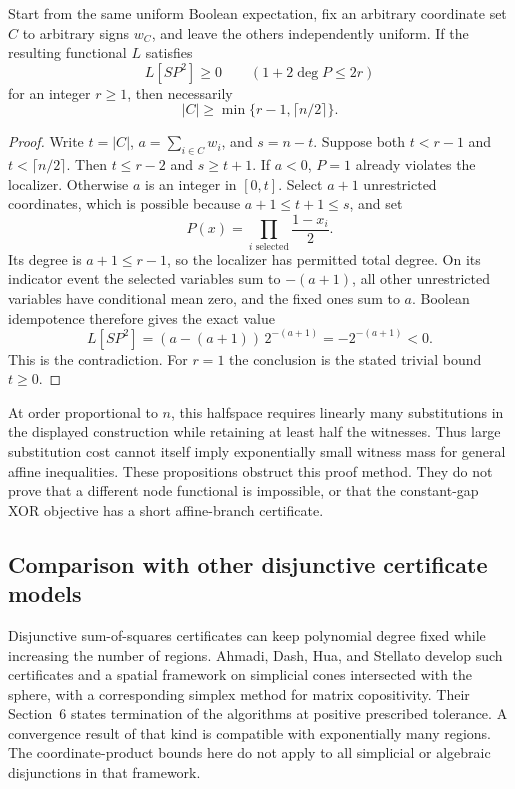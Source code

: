\begin{proposition}
\label{prop:affine-substitution-obstruction}
Start from the same uniform Boolean expectation, fix an arbitrary
coordinate set $C$ to arbitrary signs $w_C$, and leave the others
independently uniform. If the resulting functional $L$ satisfies
\[
 L[SP^2]\ge0\qquad(1+2\deg P\le2r)
\]
for an integer $r\ge1$, then necessarily
\begin{equation}\label{eq:affine-substitution-count}
 |C|\ge\min\{r-1,\lceil n/2\rceil\}.
\end{equation}
\end{proposition}
\begin{proof}
Write $t=|C|$, $a=\sum_{i\in C}w_i$, and $s=n-t$. Suppose both
$t<r-1$ and $t<\lceil n/2\rceil$. Then $t\le r-2$ and $s\ge t+1$.
If $a<0$, $P=1$ already violates the localizer. Otherwise $a$ is an
integer in $[0,t]$. Select $a+1$ unrestricted coordinates, which is
possible because $a+1\le t+1\le s$, and set
\[
 P(x)=\prod_{i\text{ selected}}\frac{1-x_i}{2}.
\]
Its degree is $a+1\le r-1$, so the localizer has permitted total degree.
On its indicator event the selected variables sum to $-(a+1)$, all
other unrestricted variables have conditional mean zero, and the fixed
ones sum to $a$. Boolean idempotence therefore gives the exact value
\[
 L[SP^2]=(a-(a+1))\,2^{-(a+1)}=-2^{-(a+1)}<0.
\]
This is the contradiction. For $r=1$ the conclusion is the stated trivial
bound $t\ge0$.
\end{proof}

At order proportional to $n$, this halfspace requires linearly many
substitutions in the displayed construction while retaining at least half
the witnesses. Thus large substitution cost cannot itself imply
exponentially small witness mass for general affine inequalities.
These propositions obstruct this proof method. They do not prove that a
different node functional is impossible, or that the constant-gap XOR
objective has a short affine-branch certificate.

\subsection{Comparison with other disjunctive certificate models}
\label{subsec:xor-literature-boundary}
Disjunctive sum-of-squares certificates can keep polynomial degree fixed
while increasing the number of regions. Ahmadi, Dash, Hua, and Stellato
\citep[Sections 2--4 and 6]{AhmadiEtAl2026} develop such certificates
and a spatial framework on simplicial cones intersected with the sphere,
with a corresponding simplex method for matrix copositivity. Their
Section~6 states termination of the algorithms at positive prescribed
tolerance. A convergence result of that kind is compatible with
exponentially many regions. The coordinate-product bounds here do not
apply to all simplicial or algebraic disjunctions in that framework.

